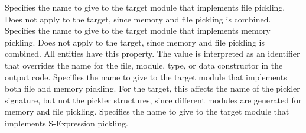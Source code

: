 \begin{description}
    Specifies the name to give to the target module that implements file pickling.
    Does not apply to the \Cplusplus{} target, since memory and file pickling is
    combined.
    Specifies the name to give to the target module that implements memory pickling.
    Does not apply to the \Cplusplus{} target, since memory and file pickling is
    combined.
    All entities have this property.  The value is interpreted as an identifier
    that overrides the name for the file, module, type, or data constructor
    in the output code.
    Specifies the name to give to the target module that implements both file
    and memory pickling.
    For the \sml{} target, this affects the name of the pickler signature, but
    not the pickler structures, since different modules are generated
    for memory and file pickling.
    Specifies the name to give to the target module that implements S-Expression pickling.
\end{description}%

